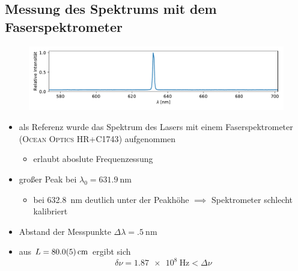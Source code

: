 \documentclass[10pt, aspectratio=169]{beamer}
\begin{document}
\subsection{Messung des Spektrums mit dem Faserspektrometer}
\begin{frame}
  \begin{figure}
    \includegraphics[width=1\columnwidth]{figs/faserspek.pdf}
  \end{figure}
  \begin{itemize}
  \item<1-> als Referenz wurde das Spektrum des Lasers mit einem
    Faserspektrometer (\textsc{Ocean Optics HR+C1743}) aufgenommen
    \begin{itemize}
    \item erlaubt aboslute Frequenzessung
    \end{itemize}
  \item<2-> gro\ss{}er Peak bei \(\lambda_0=\SI{631.9}{\nano\meter}\)
    \begin{itemize}
    \item<3-> bei \SI{632.8}{\nano\meter} deutlich unter der
      Peakh\"ohe \(\implies\) Spektrometer schlecht kalibriert
    \end{itemize}
  \end{itemize}
\end{frame}

\begin{frame}
  \begin{itemize}
  \item<1-> Abstand der Messpunkte
    \(\Delta\lambda=\SI{.5}{\nano\meter}\) 
  \item<3-> aus \(L=\SI{80+-.5}{\centi\meter}\) ergibt sich
    \begin{equation}
      \label{eq:moda}
      \delta\nu = \SI{1.87e8}{\hertz} < \Delta\nu
    \end{equation}
  \end{itemize}
\end{frame}
\end{document}
